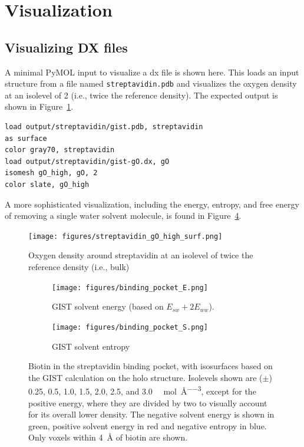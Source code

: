 \documentclass[9pt,tutorial]{livecoms}
\newcommand\inlinecode{\texttt}
\begin{document}
\section{Visualization}
\label{sec:visualization}
\subsection{Visualizing DX files}
A minimal PyMOL input to visualize a dx file is shown here.
This loads an input structure from a file named \inlinecode{streptavidin.pdb} and visualizes the oxygen density at an isolevel of 2 (i.e., twice the reference density).
The expected output is shown in Figure~\ref{fig-streptavidin_gO}.

\begin{lstlisting}[style=pymol]
load output/streptavidin/gist.pdb, streptavidin
as surface
color gray70, streptavidin
load output/streptavidin/gist-gO.dx, gO
isomesh gO_high, gO, 2
color slate, gO_high
\end{lstlisting}
A more sophisticated visualization, including the energy, entropy, and free energy of removing a single water solvent 
molecule, is found in Figure~\ref{fig-binding-pocket}.
\begin{figure}
	\centering
	\texttt{[image: figures/streptavidin\_gO\_high\_surf.png]}
	\caption{Oxygen density around streptavidin at an isolevel of twice the reference density (i.e., bulk)}
	\label{fig-streptavidin_gO}
\end{figure}
\begin{figure}
	\centering
	\begin{subfigure}[b]{0.45\textwidth}
	\texttt{[image: figures/binding\_pocket\_E.png]}
	\caption{GIST solvent energy (based on $E_{sw} + 2E_{ww}$).}
	\label{fig-binding-pocket-energy}
    \end{subfigure}
	\hfill
	\begin{subfigure}[b]{0.45\textwidth}
		\texttt{[image: figures/binding\_pocket\_S.png]}
		\caption{GIST solvent entropy}
		\label{fig-binding-pocket-entropy}
	\end{subfigure}
	\caption{Biotin in the streptavidin binding pocket, with isosurfaces based on the GIST calculation on the holo structure. 
	Isolevels shown are ($\pm$) 0.25, 0.5, 1.0, 1.5, 2.0, 2.5, and 3.0 \unit{\kilo\calorie\per\mole\per\cubic\angstrom}, except for the positive energy, where they are divided by two to visually account for its overall lower density.
	The negative solvent energy is shown in green, positive solvent energy in red and negative entropy in blue.
	Only voxels within \qty{4}{\angstrom} of biotin are shown.}
	\label{fig-binding-pocket}
\end{figure}
\end{document}
